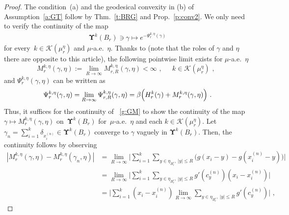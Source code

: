 \documentclass[11pt,letterpaper]{amsart}
\newcommand{\R}{{\mathbb R}}
\newcommand{\comma}{\,\,\mathrm{,}\;\,}
\newcommand{\fstop}{\,\,\mathrm{.}}
\newcommand{\QP}{{\mu}}
\newcommand{\e}{\varepsilon}
\newcommand{\dUpsilon}{{\mathbf \Upsilon}}
\newcommand{\U}{\dUpsilon}
\renewcommand{\1}{\mathbf 1}
\numberwithin{equation}{section}
\theoremstyle{plain}
\theoremstyle{definition}
\theoremstyle{remark}
\begin{document}
\begin{proof}
The condition~(a) and the geodesical convexity in (b) of Assumption~\ref{a:GT} follow by Thm.~\ref{t:BRG} and Prop.~\ref{p:conv2}. 
We only need to verify the continuity of the map
\begin{align}\label{g:GM}
\U^k(B_r) \ni \gamma \mapsto e^{-\Psi^{k, \eta}_{r}(\gamma)}
\end{align}
 for every~$k \in \mathcal K(\mu^\eta_r)$ and $\QP$-a.e.~$\eta$. 
Thanks to \cite[Lem.~1.7]{DerVas21} (note that the roles of $\gamma$ and $\eta$ there are opposite to this article), the following pointwise limit exists for $\QP$-a.e.~$\eta$
$$M_{r}^{k, \eta}(\gamma, \eta):=\lim_{R \to \infty}M_{r, R}^{k, \eta}(\gamma, \eta) <\infty \comma \quad k \in \mathcal K(\QP_r^\eta)\comma $$
and $\Psi^{k, \eta}_{r}(\gamma, \eta)$ can be written as
$$\Psi^{k, \eta}_{r}(\gamma, \eta)=\lim_{R \to \infty}\Psi^{k, \eta}_{r, R}(\gamma, \eta)=\beta \Bigl(H^k_r(\gamma)+M_{r}^{k, \eta}(\gamma, \eta)\Bigr) \fstop$$
Thus, it suffices for the continuity of ~\eqref{g:GM} to show the continuity of the map $\gamma \mapsto M_{r}^{k, \eta}(\gamma, \eta)$ on~$\U^k(B_r)$ for~$\QP$-a.e.~$\eta$ and each $k \in  \mathcal K(\QP_r^\eta)$. 
Let $\gamma_n=\sum_{i=1}^{k}\delta_{x_i^{(n)}} \in \U^k(B_r)$ converge to $\gamma$ vaguely in $\U^k(B_r)$. Then, the continuity follows by observing 
\begin{align*} %
|M_{r}^{k, \eta}(\gamma, \eta)-M_{r}^{k, \eta}(\gamma_n, \eta)| 
&= \lim_{R \to \infty}\biggl|\sum_{i=1}^k\sum_{y \in \eta_{B_r^c},\ |y| \le R}\bigl(g(x_i-y)-g(x_i^{(n)}-y)\bigr) \biggr| 
\\
&= \lim_{R \to \infty}\biggl|\sum_{i=1}^k\sum_{y \in \eta_{B_r^c},\ |y| \le R}g'(c_y^{(n)})(x_i-x_i^{(n)}) \biggr|  
\\
&=\biggl|\sum_{i=1}^k(x_i-x_i^{(n)})  \lim_{R \to \infty}\sum_{y \in \eta_{B_r^c},\ |y| \le R}g'(c_y^{(n)}) \biggr| \comma 
\end{align*}

\end{proof}
\end{document}
